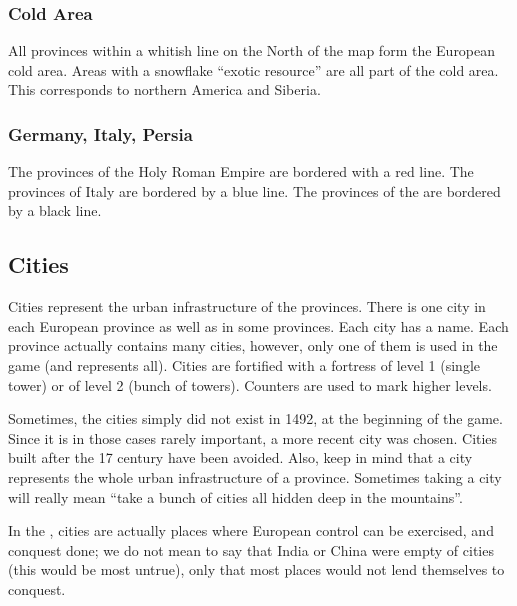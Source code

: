 \subsubsection{Cold Area}\label{chBasics:Cold Area}
\aparag[in Europe] All provinces within a whitish line on the North of the map
form the European cold area.
 Areas with a snowflake ``exotic resource'' are all part
of the \ROTW cold area. This corresponds to northern America and Siberia.


\subsubsection{Germany, Italy, Persia}
\aparag The provinces of the Holy Roman Empire are bordered with a red
line.%
\aparag The provinces of Italy are bordered by a blue line.%
\aparag The provinces of the  are bordered by a black
line.



\subsection{Cities}

\aparag Cities represent the urban infrastructure of the provinces. There is
one city in each European province as well as in some \ROTW provinces.
\bparag Each city has a name.%
\bparag Each province actually contains many cities, however, only one of them
is used in the game (and represents all).
\aparag[Level] Cities are fortified with a fortress of level 1 (single tower)
or of level 2 (bunch of towers). Counters are used to mark higher levels.
\begin{designnote}
  Sometimes, the cities simply did not exist in 1492, at the beginning of the
  game. Since it is in those cases rarely important, a more recent city was
  chosen. Cities built after the 17 century have been avoided. Also,
  keep in mind that a city represents the whole urban infrastructure of a
  province. Sometimes taking a city will really mean ``take a bunch of cities
  all hidden deep in the mountains''.

  In the \ROTW, cities are actually places where European control can be
  exercised, and conquest done; we do not mean to say that India or China were
  empty of cities (this would be most untrue), only that most places would not
  lend themselves to conquest.
\end{designnote}


